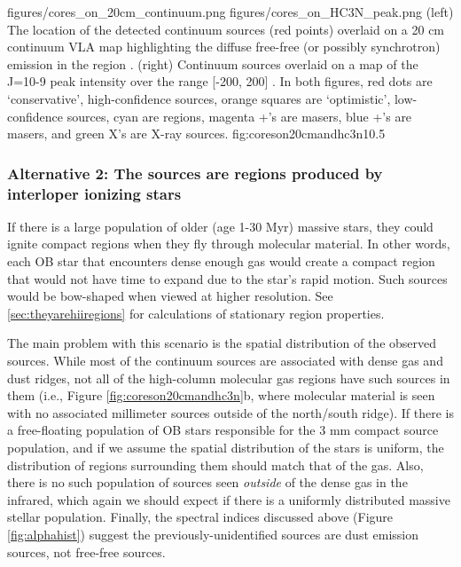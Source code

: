 \documentclass[twocolumn]{aastex61}
\begin{document}
\FigureTwo
{figures/cores_on_20cm_continuum.png}
{figures/cores_on_HC3N_peak.png}
{(left) The location of the detected continuum sources (red points) overlaid on a 20
cm continuum VLA map highlighting the diffuse free-free (or possibly
synchrotron) emission in the region \citep{Yusef-Zadeh2004a}.
(right) Continuum sources overlaid on a map
of the \cyanoacetylene J=10-9 peak intensity over the range [-200, 200] \kms.
  In both figures, red
dots are `conservative',
high-confidence sources, orange squares are `optimistic', low-confidence sources,
cyan are \hii regions, magenta +'s are \methanol masers, blue +'s are \water
masers, and green X's are X-ray sources.
}
{fig:coreson20cmandhc3n}{1}{0.5\textwidth}

\subsubsection{Alternative 2: The sources are \hii regions produced by
interloper ionizing stars}
\label{sec:alt2}
If there is a large population of older (age 1-30 Myr) massive stars, they
could ignite compact \hii regions when they fly through molecular material.  In
other words, each OB star that encounters dense enough gas would create a
compact \hii region that would not have time to expand due to the star's rapid
motion.  Such sources would be bow-shaped when viewed at higher resolution.
See \ref{sec:theyarehiiregions} for calculations of stationary \hii region
properties.

The main problem with this scenario is the spatial distribution of
the observed sources.  While most of the continuum sources are associated with
dense gas and dust ridges, not all of the high-column molecular gas regions
have such sources in them (i.e., 
Figure \ref{fig:coreson20cmandhc3n}b, where molecular material is seen with no
associated millimeter sources outside of the north/south \cyanoacetylene
ridge).  If there is a free-floating population of OB
stars responsible for the 3 mm compact source population, and if we assume the
spatial distribution of the stars is uniform, the distribution of \hii regions
surrounding them should match that of the gas. 
  Also, there is no such population of sources
seen \emph{outside} of the dense gas in the infrared,
which again we should expect if there is a uniformly distributed massive stellar
population.  Finally, the spectral indices discussed above (Figure
\ref{fig:alphahist}) suggest the previously-unidentified sources are dust
emission sources, not
free-free sources.
\end{document}
